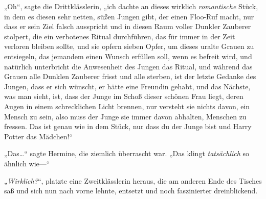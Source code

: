 „Oh“, sagte die Drittklässlerin, „ich dachte an dieses wirklich \emph{romantische} Stück, in dem es diesen sehr netten, süßen Jungen gibt, der einen Floo-Ruf macht, nur dass er sein Ziel falsch ausspricht und in diesen Raum voller Dunkler Zauberer stolpert, die ein verbotenes Ritual durchführen, das für immer in der Zeit verloren bleiben sollte, und sie opfern sieben Opfer, um dieses uralte Grauen zu entsiegeln, das jemandem einen Wunsch erfüllen soll, wenn es befreit wird, und natürlich unterbricht die Anwesenheit des Jungen das Ritual, und während das Grauen alle Dunklen Zauberer frisst und alle sterben, ist der letzte Gedanke des Jungen, dass er sich wünscht, er hätte eine Freundin gehabt, und das Nächste, was man sieht, ist, dass der Junge im Schoß dieser schönen Frau liegt, deren Augen in einem schrecklichen Licht brennen, nur versteht sie nichts davon, ein Mensch zu sein, also muss der Junge sie immer davon abhalten, Menschen zu fressen. Das ist genau wie in dem Stück, nur dass du der Junge bist und Harry Potter das Mädchen!“

„Das…“ sagte Hermine, die ziemlich überrascht war. „Das klingt \emph{tatsächlich} so ähnlich wie—“

„\emph{Wirklich?}“, platzte eine Zweitklässlerin heraus, die am anderen Ende des Tisches saß und sich nun nach vorne lehnte, entsetzt und noch faszinierter dreinblickend.

